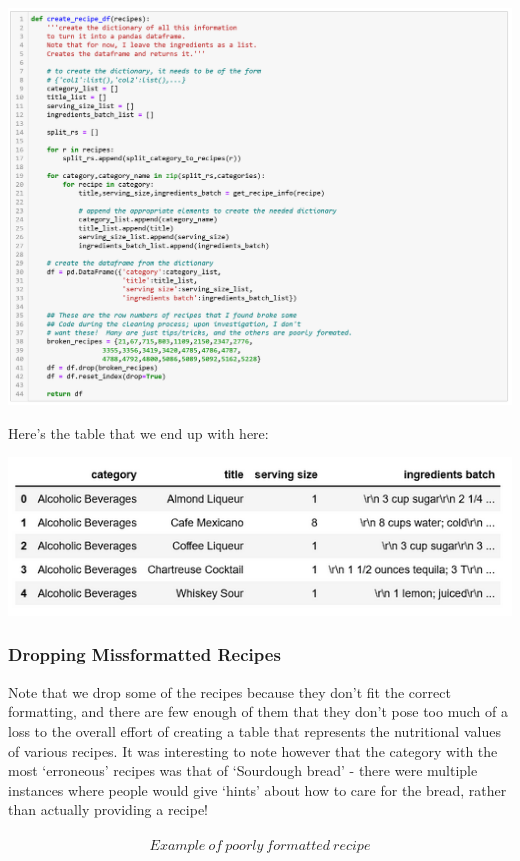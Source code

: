 \documentclass[11pt]{article}
\makeatletter
\def\maxwidth{\ifdim\Gin@nat@width>\linewidth\linewidth
    \else\Gin@nat@width\fi}
\let\Oldincludegraphics\includegraphics
\renewcommand{\includegraphics}[1]{\Oldincludegraphics[width=.8\maxwidth]{#1}}
\makeatother
\begin{document}
\includegraphics{create_recipe_df_code.png}

Here's the table that we end up with here:

\includegraphics{basic_table_head.png}

\hypertarget{dropping-missformatted-recipes}{%
\subsubsection{Dropping Missformatted
Recipes}\label{dropping-missformatted-recipes}}

Note that we drop some of the recipes because they don't fit the correct
formatting, and there are few enough of them that they don't pose too
much of a loss to the overall effort of creating a table that represents
the nutritional values of various recipes. It was interesting to note
however that the category with the most `erroneous' recipes was that of
`Sourdough bread' - there were multiple instances where people would
give `hints' about how to care for the bread, rather than actually
providing a recipe!

\hypertarget{example-of-poorly-formatted-recipe}{%
\paragraph{\texorpdfstring{\[ Example\ of\ poorly\ formatted\ recipe \]}{ Example\textbackslash{} of\textbackslash{} poorly\textbackslash{} formatted\textbackslash{} recipe }}\label{example-of-poorly-formatted-recipe}}
\end{document}
